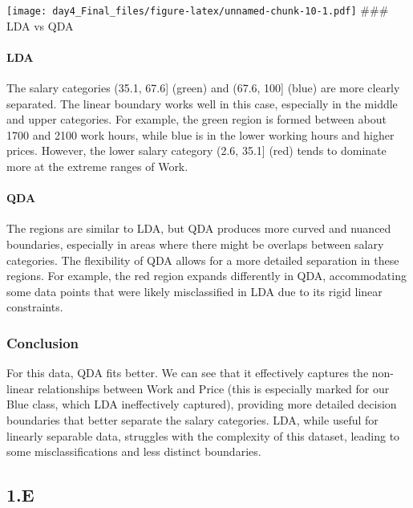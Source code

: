 \documentclass[
]{article}
\begin{document}
\texttt{[image: day4\_Final\_files/figure-latex/unnamed-chunk-10-1.pdf]}
\#\#\# LDA vs QDA

\paragraph{LDA}\label{lda}

The salary categories (35.1, 67.6{]} (green) and (67.6, 100{]} (blue)
are more clearly separated. The linear boundary works well in this case,
especially in the middle and upper categories. For example, the green
region is formed between about 1700 and 2100 work hours, while blue is
in the lower working hours and higher prices. However, the lower salary
category (2.6, 35.1{]} (red) tends to dominate more at the extreme
ranges of Work.

\paragraph{QDA}\label{qda}

The regions are similar to LDA, but QDA produces more curved and nuanced
boundaries, especially in areas where there might be overlaps between
salary categories. The flexibility of QDA allows for a more detailed
separation in these regions. For example, the red region expands
differently in QDA, accommodating some data points that were likely
misclassified in LDA due to its rigid linear constraints.

\subsubsection{Conclusion}\label{conclusion}

For this data, QDA fits better. We can see that it effectively captures
the non-linear relationships between Work and Price (this is especially
marked for our Blue class, which LDA ineffectively captured), providing
more detailed decision boundaries that better separate the salary
categories. LDA, while useful for linearly separable data, struggles
with the complexity of this dataset, leading to some misclassifications
and less distinct boundaries.

\subsection{1.E}\label{e}
\end{document}
